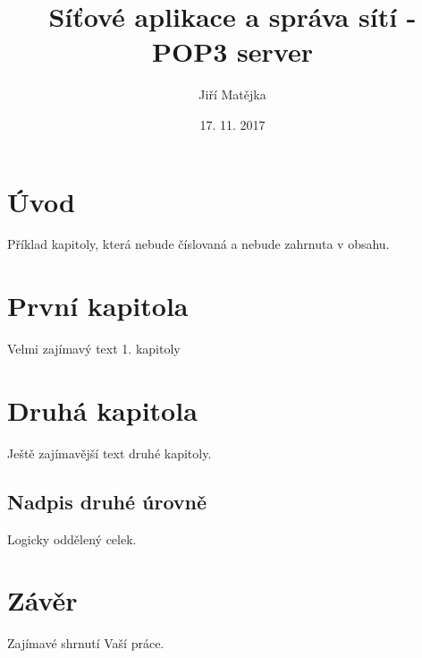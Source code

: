 \documentclass[12pt,a4paper,titlepage]{report}
\title{Síťové aplikace a správa sítí - POP3 server}
\author{Jiří Matějka}
\date{17. 11. 2017}
\begin{document}
    \maketitle
    \tableofcontents

    \section*{Úvod}
        Příklad kapitoly, která nebude číslovaná a nebude zahrnuta v obsahu.

    \section{První kapitola}
        Velmi zajímavý text 1. kapitoly

    \section{Druhá kapitola}
        Ještě zajímavější text druhé kapitoly.

        \subsection{Nadpis druhé úrovně}
            Logicky oddělený celek.

   \section*{Závěr}
       Zajímavé shrnutí Vaší práce.
\end{document}
